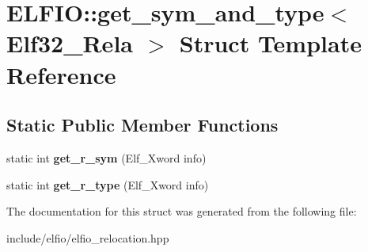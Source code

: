 \hypertarget{struct_e_l_f_i_o_1_1get__sym__and__type_3_01_elf32___rela_01_4}{}\section{E\+L\+F\+IO\+:\+:get\+\_\+sym\+\_\+and\+\_\+type$<$ Elf32\+\_\+\+Rela $>$ Struct Template Reference}
\label{struct_e_l_f_i_o_1_1get__sym__and__type_3_01_elf32___rela_01_4}
\subsection*{Static Public Member Functions}
\begin{DoxyCompactItemize}
\item 
static int {\bfseries get\+\_\+r\+\_\+sym} (Elf\+\_\+\+Xword info)\hypertarget{struct_e_l_f_i_o_1_1get__sym__and__type_3_01_elf32___rela_01_4_acc95678340a81c6c8625aacfc4c40bbe}{}\label{struct_e_l_f_i_o_1_1get__sym__and__type_3_01_elf32___rela_01_4_acc95678340a81c6c8625aacfc4c40bbe}

\item 
static int {\bfseries get\+\_\+r\+\_\+type} (Elf\+\_\+\+Xword info)\hypertarget{struct_e_l_f_i_o_1_1get__sym__and__type_3_01_elf32___rela_01_4_a62a6d5153d99d93b8c2c21de1f233b86}{}\label{struct_e_l_f_i_o_1_1get__sym__and__type_3_01_elf32___rela_01_4_a62a6d5153d99d93b8c2c21de1f233b86}

\end{DoxyCompactItemize}


The documentation for this struct was generated from the following file\+:\begin{DoxyCompactItemize}
\item 
include/elfio/elfio\+\_\+relocation.\+hpp\end{DoxyCompactItemize}
